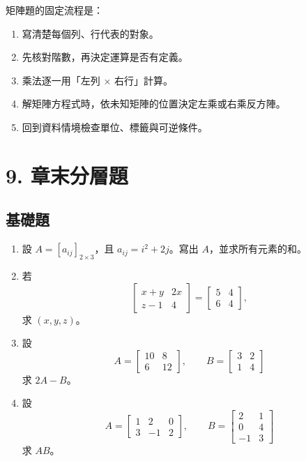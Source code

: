 \documentclass[11pt,a4paper]{article}
\providecommand{\tightlist}{%
  \setlength{\itemsep}{0pt}\setlength{\parskip}{0pt}}
\begin{document}
矩陣題的固定流程是：

\begin{enumerate}
\def\labelenumi{\arabic{enumi}.}
\tightlist
\item
  寫清楚每個列、行代表的對象。
\item
  先核對階數，再決定運算是否有定義。
\item
  乘法逐一用「左列 × 右行」計算。
\item
  解矩陣方程式時，依未知矩陣的位置決定左乘或右乘反方陣。
\item
  回到資料情境檢查單位、標籤與可逆條件。
\end{enumerate}

\section{9. 章末分層題}\label{ux7ae0ux672bux5206ux5c64ux984c}

\subsection{基礎題}\label{ux57faux790eux984c}

\begin{enumerate}
\def\labelenumi{\arabic{enumi}.}
\item
  設 \(A=[a_{ij}]_{2\times3}\)，且 \(a_{ij}=i^2+2j\)。寫出 \(A\)，並求所有元素的和。
\item
  若
  \[
  \begin{bmatrix}x+y&2x\\z-1&4\end{bmatrix}
  =\begin{bmatrix}5&4\\6&4\end{bmatrix},
  \]
  求 \((x,y,z)\)。
\item
  設
  \[A=\begin{bmatrix}10&8\\6&12\end{bmatrix},\qquad
  B=\begin{bmatrix}3&2\\1&4\end{bmatrix}\]
  求 \(2A-B\)。
\item
  設
  \[
  A=\begin{bmatrix}1&2&0\\3&-1&2\end{bmatrix},
  \qquad
  B=\begin{bmatrix}2&1\\0&4\\-1&3\end{bmatrix}
  \]
  求 \(AB\)。
\end{enumerate}
\end{document}
